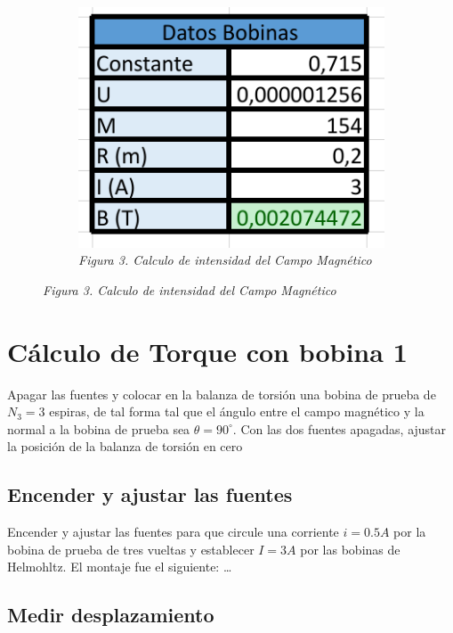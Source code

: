 \begin{figure}[H]
    \centering
    \begin{subfigure}[b]{0.5\textwidth}
        \centering
        \includegraphics[width=\textwidth]{Figures/0. General/2.1.png}
        \caption{\textit{Figura 3. Calculo de intensidad del Campo Magnético}}
        \label{Figura 3}
    \end{subfigure}
\end{figure}


\section{Cálculo de Torque con bobina 1}

Apagar las fuentes y colocar en la balanza de torsión una bobina de prueba de
$N_3 = 3$ espiras, de tal forma tal que el ángulo entre el campo magnético y la
normal a la bobina de prueba sea $\theta = 90^{\circ}$. Con las dos fuentes
apagadas, ajustar la posición de la balanza de torsión en cero

\subsection{Encender y ajustar las fuentes}

Encender y ajustar las fuentes para que circule una corriente $i = 0.5A$ por la
bobina de prueba de tres vueltas y establecer $I = 3A$ por las bobinas de
Helmohltz. El montaje fue el siguiente:
\dots

\subsection{Medir desplazamiento}

